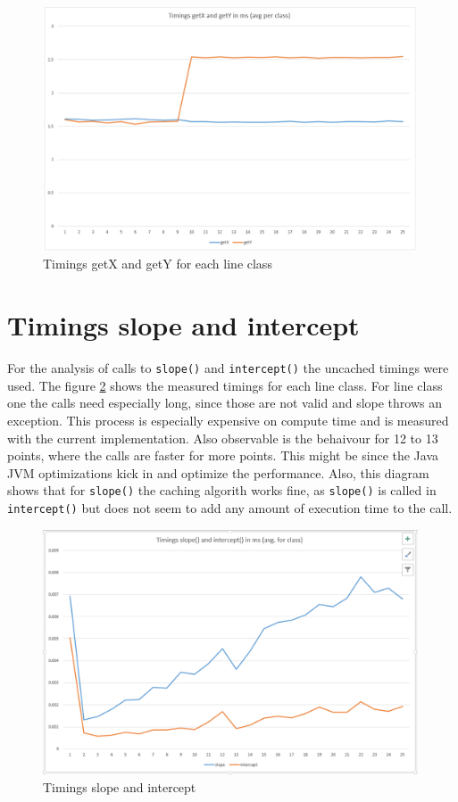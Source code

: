 \begin{figure}[h!]
    \begin{center}
        \includegraphics[width=0.99\textwidth]{img/getx_gety.png}
        \caption{Timings getX and getY for each line class}
        \label{fig:getY_getX}
    \end{center}
\end{figure}

\section{Timings slope and intercept}
For the analysis of calls to \texttt{slope()} and \texttt{intercept()} the uncached timings were used. The figure \ref{fig:slope_intercept} shows the measured timings for each line class. For line class one the calls need especially long, since those are not valid and slope throws an exception. This process is especially expensive on compute time and is measured with the current implementation. Also observable is the behaivour for 12 to 13 points, where the calls are faster for more points. This might be since the Java JVM optimizations kick in and optimize the performance. Also, this diagram shows that for \texttt{slope()} the caching algorith works fine, as \texttt{slope()} is called in \texttt{intercept()} but does not seem to add any amount of execution time to the call.

\begin{figure}[h!]
    \begin{center}
        \includegraphics[width=0.99\textwidth]{img/slope_intercept_avg.png}
        \caption{Timings slope and intercept}
        \label{fig:slope_intercept}
    \end{center}
\end{figure}
